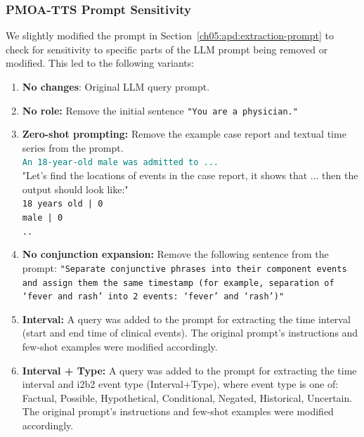 \subsubsection{PMOA-TTS Prompt Sensitivity}
\label{ch05:apd:sensitivity-llm-prompt}

We slightly modified the prompt in Section~\ref{ch05:apd:extraction-prompt} to check for sensitivity to specific parts of the LLM prompt being removed or modified.
This led to the following variants:
\begin{enumerate}\raggedright
    \item \textbf{No changes}: Original LLM query prompt. %
    
    \item \textbf{No role:} Remove the initial sentence \texttt{"You are a physician."}
    
    \item \textbf{Zero-shot prompting:} Remove the example case report and textual time series from the prompt. \\
    \textcolor{teal}{\texttt{An 18-year-old male was admitted to ...}}\\
    "Let's find the locations of events in the case report, it shows that ... then the output should look like:"\\
    \texttt{18 years old | 0 \\
    male | 0 \\
    ..}

    \item \textbf{No conjunction expansion:} Remove the following sentence from the prompt: \texttt{"Separate conjunctive phrases into their component events and assign them the same timestamp (for example, separation of ‘fever and rash’ into 2 events: ‘fever’ and ‘rash’)"}
    
    \item \textbf{Interval:} A query was added to the prompt for extracting the time interval (start and end time of clinical events).
The original prompt’s instructions and few-shot examples were modified accordingly. 
    
    \item \textbf{Interval + Type:} A query was added to the prompt for extracting the time interval and i2b2
    event type (Interval+Type), where event type is one of: Factual, Possible, Hypothetical, Conditional, Negated, Historical, Uncertain.
The original prompt’s instructions and few-shot examples were modified accordingly. 
\end{enumerate}


